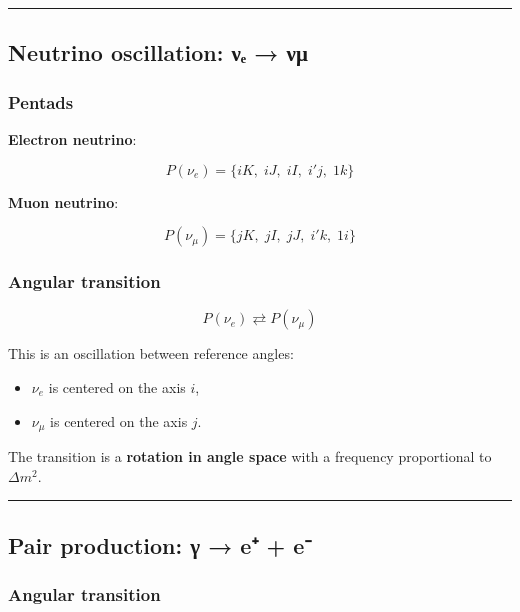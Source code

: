 \documentclass[11pt]{article}
\providecommand{\tightlist}{%
\setlength{\itemsep}{2pt}\setlength{\parskip}{6pt}
}
\begin{document}
\begin{center}\rule{0.5\linewidth}{0.5pt}\end{center}

\hypertarget{neutrino-oscillation-ux3bdux2091-ux3bdux3bc}{%
\subsection{Neutrino oscillation: νₑ →
νμ}\label{neutrino-oscillation-ux3bdux2091-ux3bdux3bc}}

\hypertarget{pentads-2}{%
\subsubsection{Pentads}\label{pentads-2}}

\textbf{Electron neutrino}:

\[P(\nu_e) = \{ iK,\; iJ,\; iI,\; i'j,\; 1k \}\]

\textbf{Muon neutrino}:

\[P(\nu_\mu) = \{ jK,\; jI,\; jJ,\; i'k,\; 1i \}\]

\hypertarget{angular-transition-4}{%
\subsubsection{Angular transition}\label{angular-transition-4}}

\[P(\nu_e) \rightleftarrows P(\nu_\mu)\]

This is an oscillation between reference angles:

\begin{itemize}
\tightlist
\item
  \(\nu_e\) is centered on the axis \(i\),
\item
  \(\nu_\mu\) is centered on the axis \(j\).
\end{itemize}

The transition is a \textbf{rotation in angle space} with a frequency
proportional to \(\Delta m^2\).

\begin{center}\rule{0.5\linewidth}{0.5pt}\end{center}

\hypertarget{pair-production-ux3b3-e-e}{%
\subsection{Pair production: γ → e⁺ +
e⁻}\label{pair-production-ux3b3-e-e}}

\hypertarget{angular-transition-5}{%
\subsubsection{Angular transition}\label{angular-transition-5}}
\end{document}
